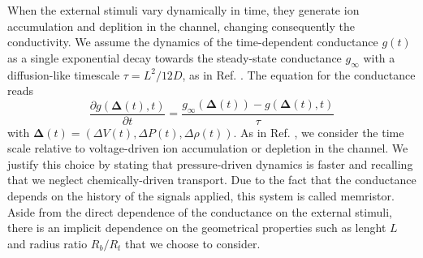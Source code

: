 \documentclass[reprint,superscriptaddress,prb,showkeys]{revtex4-2}
\newcommand{\brac}[1]{\left(#1 \right)} %
\begin{document}

When the external stimuli vary dynamically in time, they generate ion accumulation and deplition in the channel, changing consequently the conductivity. We assume the dynamics of the time-dependent conductance $g(t)$ as a single exponential decay towards the steady-state conductance $g_{\infty}$ with a diffusion-like timescale $\tau = L^2/12D$, as in Ref. \cite{Rene_IonicNeuromorphic}. The equation for the conductance reads
\begin{equation}
\frac{\partial g\brac{\boldsymbol{\Delta}(t), t}}{\partial t} = \frac{g_{\infty}\brac{\boldsymbol{\Delta}(t)}-g\brac{\boldsymbol{\Delta}(t), t}}{\tau}
\label{eq:eqofmotconductance}
\end{equation}
with $\boldsymbol{\Delta}(t) = \brac{\Delta V\brac{t},\Delta P\brac{t}, \Delta \rho\brac{t}}$.
As in Ref. \cite{Rene_IonicNeuromorphic}, we consider the time scale relative to voltage-driven ion accumulation or depletion in the channel. We justify this choice by stating that pressure-driven dynamics is faster and recalling that we neglect chemically-driven transport. Due to the fact that the conductance depends on the history of the signals applied, this system is called memristor. Aside from the direct dependence of the conductance on the external stimuli, there is an implicit dependence on the geometrical properties such as lenght $L$ and radius ratio $R_b/R_t$ that we choose to consider.
\end{document}
